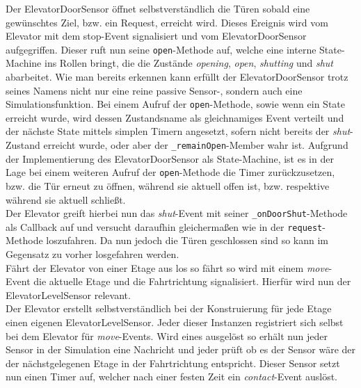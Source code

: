 Der ElevatorDoorSensor öffnet selbstverständlich die Türen sobald eine gewünschtes Ziel, bzw. ein Request, erreicht wird.
Dieses Ereignis wird vom Elevator mit dem \glqq stop\grqq-Event signalisiert und vom ElevatorDoorSensor aufgegriffen.
Dieser ruft nun seine \texttt{open}-Methode auf, welche eine interne State-Machine ins Rollen bringt, die die Zustände \textit{opening}, \textit{open}, \textit{shutting} und \textit{shut} abarbeitet.
Wie man bereits erkennen kann erfüllt der ElevatorDoorSensor trotz seines Namens nicht nur eine reine passive Sensor-, sondern auch eine Simulationsfunktion.
Bei einem Aufruf der \texttt{open}-Methode, sowie wenn ein State erreicht wurde, wird dessen Zustandsname als gleichnamiges Event verteilt und der nächste State mittels simplen Timern angesetzt, sofern nicht bereits der \textit{shut}-Zustand erreicht wurde, oder aber der \texttt{_remainOpen}-Member wahr ist.
Aufgrund der Implementierung des ElevatorDoorSensor als State-Machine, ist es in der Lage bei einem weiteren Aufruf der \texttt{open}-Methode die Timer zurückzusetzen, bzw. die Tür erneut zu öffnen, während sie aktuell offen ist, bzw. respektive während sie aktuell schließt. \\

Der Elevator greift hierbei nun das \textit{shut}-Event mit seiner \texttt{_onDoorShut}-Methode als Callback auf und versucht daraufhin gleichermaßen wie in der \texttt{request}-Methode loszufahren.
Da nun jedoch die Türen geschlossen sind so kann im Gegensatz zu vorher losgefahren werden. \\

Fährt der Elevator von einer Etage aus los so fährt so wird mit einem \textit{move}-Event die aktuelle Etage und die Fahrtrichtung signalisiert.
Hierfür wird nun der ElevatorLevelSensor relevant. \\

Der Elevator erstellt selbstverständlich bei der Konstruierung für jede Etage einen eigenen ElevatorLevelSensor.
Jeder dieser Instanzen registriert sich selbst bei dem Elevator für \textit{move}-Events.
Wird eines ausgelöst so erhält nun jeder Sensor in der Simulation eine Nachricht und jeder prüft ob es der Sensor wäre der der nächstgelegenen Etage in der Fahrtrichtung entspricht.
Dieser Sensor setzt nun einen Timer auf, welcher nach einer festen Zeit ein \textit{contact}-Event auslöst. \\

